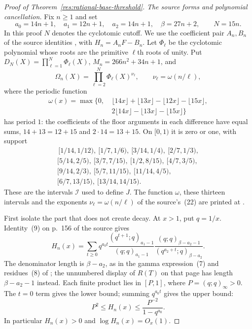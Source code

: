 \documentclass[11pt]{article}
\begin{document}
\begin{proof}[Proof of Theorem~\ref{res:rational-base-threshold}]
\emph{The source forms and polynomial cancellation.}
Fix $n\ge1$ and set
\[
 a_0=14n+1,\quad a_1=12n+1,\quad a_2=14n+1,\quad\beta=27n+2,
 \qquad N=15n.
\]
In this proof $N$ denotes the cyclotomic cutoff. We use the
coefficient pair $A_n,B_n$ of the source identities
\cite[(8)--(11), pp.~156--157]{zudilin2004}, with $H_n=A_nF-B_n$.
Let $\Phi_\ell$ be the cyclotomic polynomial whose roots are the primitive
$\ell$th roots of unity. Put $D_N(X)=\prod_{\ell=1}^{N}\Phi_\ell(X)$,
$M_n=266n^2+34n+1$, and
\[
 \Omega_n(X)=\prod_{\ell=2}^{N}\Phi_\ell(X)^{\nu_\ell},
 \qquad \nu_\ell=\omega(n/\ell),
\]
where the periodic function
\[
\begin{split}
\omega(x)=\max\{0,&\ \lfloor14x\rfloor+\lfloor13x\rfloor
                  -\lfloor12x\rfloor-\lfloor15x\rfloor,\\
                &\ 2\lfloor14x\rfloor-\lfloor13x\rfloor
                  -\lfloor15x\rfloor\}
\end{split}
\]
has period $1$: the coefficients of the floor arguments in each
difference have equal sums, $14+13=12+15$ and $2\cdot14=13+15$.
On $[0,1)$ it is zero or one, with support
\[
\begin{gathered}
\,[1/14,1/12),\ [1/7,1/6),\ [3/14,1/4),\ [2/7,1/3),\\
[5/14,2/5),\ [3/7,7/15),\ [1/2,8/15),\ [4/7,3/5),\\
[9/14,2/3),\ [5/7,11/15),\ [11/14,4/5),\\
[6/7,13/15),\ [13/14,14/15).
\end{gathered}
\]
These are the intervals $\mathcal I$ used to define $J$.
The function $\omega$, these thirteen intervals and the exponents
$\nu_\ell=\omega(n/\ell)$ of the source's~(22) are printed at
\cite[pp.~161--162]{zudilin2004}.


First isolate the part that does not create decay. At $x>1$, put
$q=1/x$. Identity~(9) on p.~156 of the source gives
\[
 H_n(x)=\sum_{t\ge0}q^{a_0t}
 \frac{(q^{t+1};q)_{a_1-1}}{(q;q)_{a_1-1}}
 \frac{(q;q)_{\beta-a_2-1}}{(q^{a_2+t};q)_{\beta-a_2}}.
\]
The denominator length is $\beta-a_2$, as in the gamma expression~(7)
and residues~(8) of \cite[p.~156]{zudilin2004}; the unnumbered display
of $R(T)$ on that page has length $\beta-a_2-1$ instead.
Each finite product lies in $[P,1]$, where $P=(q;q)_\infty>0$.
The $t=0$ term gives the lower bound; summing $q^{a_0t}$ gives
the upper bound:
\[
 P^2\le H_n(x)\le\frac{P^{-2}}{1-q^{a_0}}.
\]
In particular $H_n(x)>0$ and $\log H_n(x)=O_x(1)$.


\end{proof}
\end{document}
